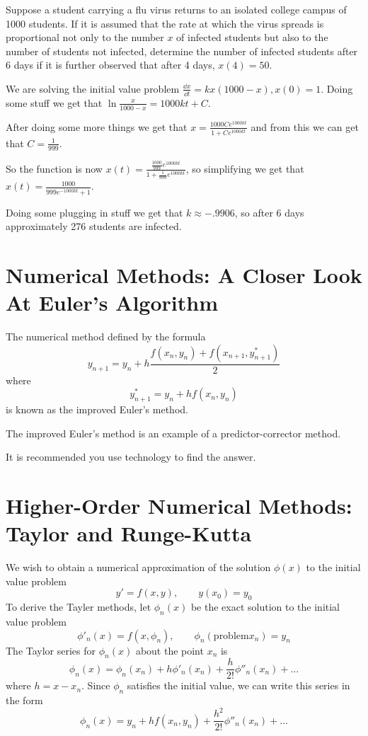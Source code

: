 \documentclass[../diffeq.tex]{subfiles}
\begin{document}
\begin{example}
    Suppose a student carrying a flu virus returns to an isolated college campus of 1000 students. If it is assumed that the rate at which the virus spreads is proportional not only to the number $x$ of infected students 
    but also to the number of students not infected, determine the number of infected students after 6 days if it is further observed that after 4 days, $x(4)=50$.

    We are solving the initial value problem $\frac{\dd x}{\dd t}=kx(1000-x), x(0)=1$. Doing some stuff we get that $\ln \frac{x}{1000-x}=1000kt+C$.

    After doing some more things we get that $x=\frac{1000Ce^{1000kt}}{1+Ce^{1000kt}}$ and from this we can get that $C=\frac{1}{999}$.

    So the function is now $x(t)=\frac{\frac{1000}{999}e^{1000kt}}{1+\frac{1}{999}e^{1000kt}}$, so simplifying we get that $x(t)=\frac{1000}{999e^{-1000kt}+1}$.

    Doing some plugging in stuff we get that $k\approx -.9906$, so after 6 days approximately 276 students are infected.
\end{example}

\section{Numerical Methods: A Closer Look At Euler's Algorithm}
The numerical method defined by the formula 
\[ y_{n+1}=y_n+h\frac{f(x_n,y_n)+f(x_{n+1}, y_{n+1}^*)}{2} \]
where 
\[ y_{n+1}^* = y_n + hf(x_n,y_n) \]
is known as the improved Euler's method.

The improved Euler's method is an example of a predictor-corrector method.

It is recommended you use technology to find the answer.

\section{Higher-Order Numerical Methods: Taylor and Runge-Kutta}
We wish to obtain a numerical approximation of the solution $\phi(x)$ to the initial value problem 
\[ y' = f(x,y), \qquad y(x_0)=y_0 \]
To derive the Tayler methods, let $\phi_n(x)$ be the exact solution to the initial value problem 
\[ \phi'_n(x)=f(x,\phi_n), \qquad \phi_n(\text{problem}x_n)=y_n \]
The Taylor series for $\phi_n (x)$ about the point $x_n$ is 
\[ \phi_n (x) = \phi_n(x_n)+h\phi'_n(x_n)+\frac{h}{2!}\phi''_n (x_n)+\dots \]
where $h=x-x_n$. Since $\phi_n$ satisfies the initial value, we can write this series in the form 
\[ \phi_n(x)=y_n+hf(x_n,y_n)+\frac{h^2}{2!}\phi''_n(x_n)+\dots \]
\end{document}
